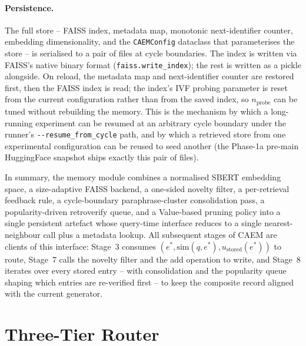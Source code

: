 \paragraph{Persistence.}
The full store -- FAISS index, metadata map, monotonic next-identifier counter, embedding dimensionality, and the \texttt{CAEMConfig} dataclass that parameterises the store -- is serialised to a pair of files at cycle boundaries. The index is written via FAISS's native binary format (\texttt{faiss.write\_index}); the rest is written as a pickle alongside. On reload, the metadata map and next-identifier counter are restored first, then the FAISS index is read; the index's IVF probing parameter is reset from the current configuration rather than from the saved index, so $n_{\text{probe}}$ can be tuned without rebuilding the memory. This is the mechanism by which a long-running experiment can be resumed at an arbitrary cycle boundary under the runner's \verb|--resume_from_cycle| path, and by which a retrieved store from one experimental configuration can be reused to seed another (the Phase-1a pre-main HuggingFace snapshot ships exactly this pair of files).

In summary, the memory module combines a normalised SBERT embedding space, a size-adaptive FAISS backend, a one-sided novelty filter, a per-retrieval feedback rule, a cycle-boundary paraphrase-cluster consolidation pass, a popularity-driven retroverify queue, and a Value-based pruning policy into a single persistent artefact whose query-time interface reduces to a single nearest-neighbour call plus a metadata lookup. All subsequent stages of CAEM are clients of this interface: Stage~3 consumes $(e^{*}, \mathrm{sim}(q, e^{*}), u_{\text{stored}}(e^{*}))$ to route, Stage~7 calls the novelty filter and the add operation to write, and Stage~8 iterates over every stored entry -- with consolidation and the popularity queue shaping which entries are re-verified first -- to keep the composite record aligned with the current generator.

\section{Three-Tier Router}
\label{sec:router}

